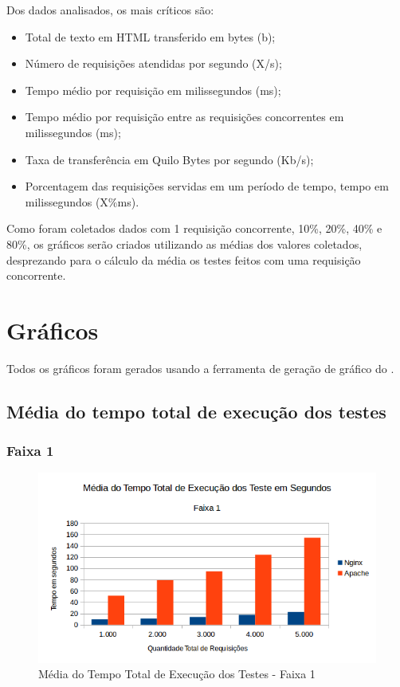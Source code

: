 Dos dados analisados, os mais críticos são:

\begin{itemize}
	\item Total de texto em HTML transferido em bytes (b);
	\item Número de requisições atendidas por segundo (X/s);
	\item Tempo médio por requisição em milissegundos (ms);
	\item Tempo médio por requisição entre as requisições concorrentes em milissegundos (ms);
	\item Taxa de transferência em Quilo Bytes por segundo (Kb/s);
	\item Porcentagem das requisições servidas em um período de tempo, tempo em milissegundos (X\%ms).
\end{itemize}

Como foram coletados dados com 1 requisição concorrente, 10\%, 20\%, 40\% e 80\%, os gráficos serão criados utilizando as médias dos valores coletados, desprezando para o cálculo da média os testes feitos com uma requisição concorrente.

\section{Gráficos}
Todos os gráficos foram gerados usando a ferramenta de geração de gráfico do .
\subsection{Média do tempo total de execução dos testes}
\subsubsection{Faixa 1}
\begin{figure}[h!]
	\centering
	\includegraphics[width=0.6\linewidth]{graficos/grafico1-f1} 
	\caption{Média do Tempo Total de Execução dos Testes - Faixa 1}
	\label{fig:grafico1-f1}
\end{figure}



